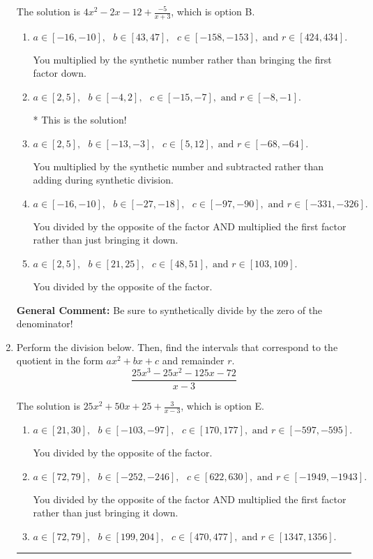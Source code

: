 \documentclass{extbook}[14pt]
\newcommand{\litem}[1]{\item #1

\rule{\textwidth}{0.4pt}}
\begin{document}
\begin{enumerate}
{The solution is \( 4x^{2} -2 x -12 + \frac{-5}{x + 3} \), which is option B.\begin{enumerate}[label=\Alph*.]
\item \( a \in [-16, -10], \text{   } b \in [43, 47], \text{   } c \in [-158, -153], \text{   and   } r \in [424, 434]. \)

 You multiplied by the synthetic number rather than bringing the first factor down.
\item \( a \in [2, 5], \text{   } b \in [-4, 2], \text{   } c \in [-15, -7], \text{   and   } r \in [-8, -1]. \)

* This is the solution!
\item \( a \in [2, 5], \text{   } b \in [-13, -3], \text{   } c \in [5, 12], \text{   and   } r \in [-68, -64]. \)

 You multiplied by the synthetic number and subtracted rather than adding during synthetic division.
\item \( a \in [-16, -10], \text{   } b \in [-27, -18], \text{   } c \in [-97, -90], \text{   and   } r \in [-331, -326]. \)

 You divided by the opposite of the factor AND multiplied the first factor rather than just bringing it down.
\item \( a \in [2, 5], \text{   } b \in [21, 25], \text{   } c \in [48, 51], \text{   and   } r \in [103, 109]. \)

 You divided by the opposite of the factor.
\end{enumerate}

\textbf{General Comment:} Be sure to synthetically divide by the zero of the denominator!
}
\litem{
Perform the division below. Then, find the intervals that correspond to the quotient in the form $ax^2+bx+c$ and remainder $r$.
\[ \frac{25x^{3} -25 x^{2} -125 x -72}{x -3} \]

The solution is \( 25x^{2} +50 x + 25 + \frac{3}{x -3} \), which is option E.\begin{enumerate}[label=\Alph*.]
\item \( a \in [21, 30], \text{   } b \in [-103, -97], \text{   } c \in [170, 177], \text{   and   } r \in [-597, -595]. \)

 You divided by the opposite of the factor.
\item \( a \in [72, 79], \text{   } b \in [-252, -246], \text{   } c \in [622, 630], \text{   and   } r \in [-1949, -1943]. \)

 You divided by the opposite of the factor AND multiplied the first factor rather than just bringing it down.
\item \( a \in [72, 79], \text{   } b \in [199, 204], \text{   } c \in [470, 477], \text{   and   } r \in [1347, 1356]. \)


\end{enumerate}}
\end{enumerate}
\end{document}
